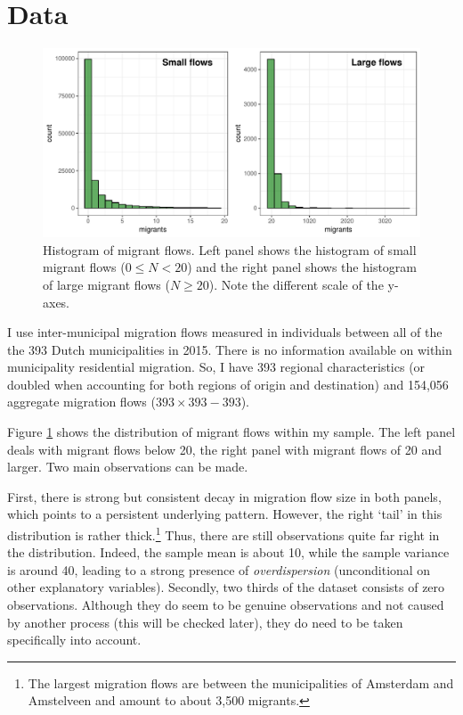 \documentclass[fleqn,10pt]{SelfArx} %
\begin{document}
        \section{Data}

        \begin{figure}[t!]\centering %
          \includegraphics[width=0.8\linewidth]{../fig/hist_mig.pdf}
          \caption{Histogram of migrant flows. Left panel shows the
            histogram of small migrant flows ($0 \leq N < 20$) and the right
            panel shows the histogram of large migrant flows
            ($N \geq 20$). Note the different scale of the y-axes.}
          \label{fig:hist_mig}
        \end{figure}


        I use inter-municipal migration flows measured in individuals
        between all of the the 393 Dutch municipalities in 2015. There
        is no information available on within municipality residential
        migration. So, I have 393 regional characteristics (or doubled
        when accounting for both regions of origin and destination)
        and 154,056 aggregate migration flows ($393 \times 393 - 393$).

        Figure \ref{fig:hist_mig} shows the distribution of migrant
        flows within my sample. The left panel deals with migrant
        flows below 20, the right panel with migrant flows of 20 and
        larger. Two main observations can be made.

        First, there is strong but consistent decay in migration flow size in both panels,
        which points to a persistent underlying pattern. However, the
        right `tail' in this distribution is rather thick.\footnote{The
          largest migration flows are between the municipalities of
          Amsterdam and Amstelveen and amount to about 3,500
          migrants.} Thus, there are still observations quite far
        right in the distribution. Indeed, the sample mean is about
        10, while the sample variance is around 40, leading to a
        strong presence of \emph{overdispersion} (unconditional on
        other explanatory variables).  Secondly, two thirds of the
        dataset consists of zero observations. Although they do seem
        to be genuine observations and not caused by another process
        (this will be checked later), they do need to be taken
        specifically into account.
\end{document}
